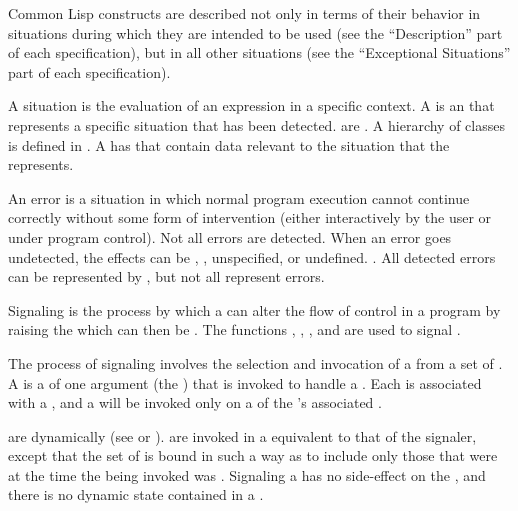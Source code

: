 

Common Lisp constructs are described not only in terms of their
behavior in situations during which they are intended to be used (see
the ``Description'' part of each  specification),
but in all other situations (see the ``Exceptional Situations''
part of each  specification).
 
A situation is the evaluation of an expression in a specific context.
A  is an  that
represents a specific situation that has been detected.  
 are .
A hierarchy of  classes is defined in \clisp.  
A  has  that contain data 
relevant to the situation that the  represents.

An error is a situation in which normal program execution cannot
continue correctly without some form of intervention (either
interactively by the user or under program control).  Not all errors
are detected.  When an error goes undetected, the effects can be
, , unspecified, or
undefined. \Seesection\Definitions.  All detected errors can
be represented by , but not all 
 represent errors.
 
Signaling is the process by which a  can alter
the flow of control in a program by raising the 
 which can then be .  The functions
, , , and
 are used to signal .
 
The process of signaling involves the selection and invocation of a
 from a set of  .  
A  is a  of one argument (the 
) that is invoked to handle a .
Each  is associated with a  ,
and a  will be invoked only on a  of the
's associated .
 
  are  dynamically
(see  or ).
 are invoked in a  
equivalent to that of the signaler,
except that the set of   
is bound in such a way as to include only those that were  
at the time the  being invoked was .
Signaling a  has no side-effect on the , 
and there is no dynamic state contained in a .
 
